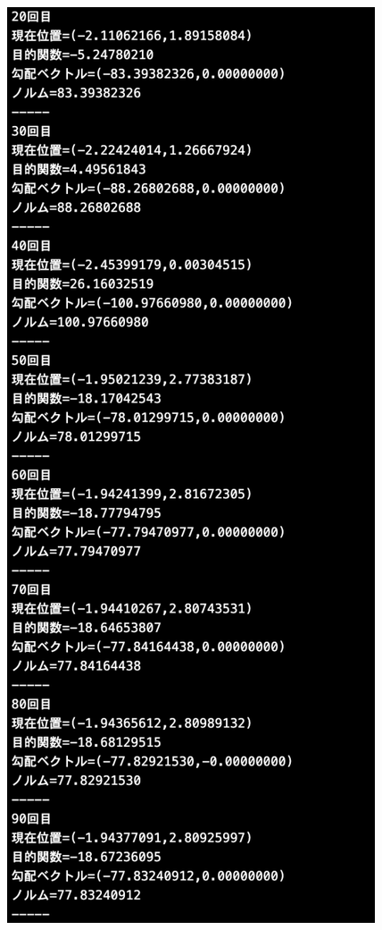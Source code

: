 \documentclass[12pt]{jarticle}
\begin{document}
\begin{figure}[h]
    \begin{minipage}{0.5\hsize}
        \begin{center}
            \includegraphics[scale=0.2]{kadai1_2n_out1_2_2.png}
        \end{center}

\end{minipage}
\end{figure}
\end{document}
